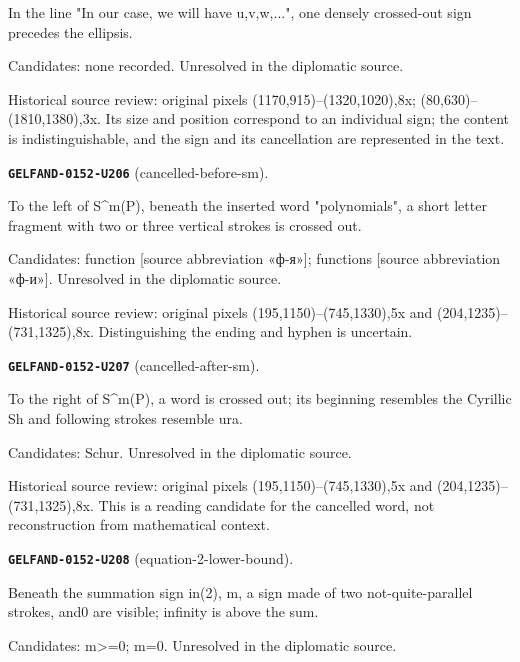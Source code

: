 In the line "In our case, we will have u,v,w,...", one densely crossed-out sign precedes the ellipsis.\par
Candidates: none recorded. Unresolved in the diplomatic source.\par
Historical source review: original pixels (1170,915)–(1320,1020),8x; (80,630)–(1810,1380),3x. Its size and position correspond to an individual sign; the content is indistinguishable, and the sign and its cancellation are represented in the text.\par\medskip
\par\noindent\leavevmode{}\label{GELFAND-0152-U206}\textbf{\texttt{GELFAND-0152-U206}} (cancelled-before-sm).\nopagebreak[4]\par
To the left of S\textasciicircum{}m(P), beneath the inserted word "polynomials", a short letter fragment with two or three vertical strokes is crossed out.\par
Candidates: function [source abbreviation «ф-я»]; functions [source abbreviation «ф-и»]. Unresolved in the diplomatic source.\par
Historical source review: original pixels (195,1150)–(745,1330),5x and (204,1235)–(731,1325),8x. Distinguishing the ending and hyphen is uncertain.\par\medskip
\par\noindent\leavevmode{}\label{GELFAND-0152-U207}\textbf{\texttt{GELFAND-0152-U207}} (cancelled-after-sm).\nopagebreak[4]\par
To the right of S\textasciicircum{}m(P), a word is crossed out; its beginning resembles the Cyrillic Sh and following strokes resemble ura.\par
Candidates: Schur. Unresolved in the diplomatic source.\par
Historical source review: original pixels (195,1150)–(745,1330),5x and (204,1235)–(731,1325),8x. This is a reading candidate for the cancelled word, not reconstruction from mathematical context.\par\medskip
\par\noindent\leavevmode{}\label{GELFAND-0152-U208}\textbf{\texttt{GELFAND-0152-U208}} (equation-2-lower-bound).\nopagebreak[4]\par
Beneath the summation sign in(2), m, a sign made of two not-quite-parallel strokes, and0 are visible; infinity is above the sum.\par
Candidates: m>=0; m=0. Unresolved in the diplomatic source.\par
